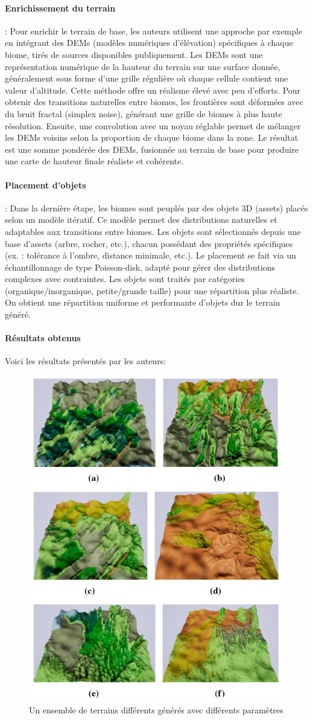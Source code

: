     \paragraph{Enrichissement du terrain}: Pour enrichir le terrain de base, les auteurs utilisent une approche par exemple en intégrant des DEMs (modèles numériques d'élévation) spécifiques à chaque biome, tirés de sources disponibles publiquement. Les DEMs sont une représentation numérique de la hauteur du terrain sur une surface donnée, généralement sous forme d'une grille régulière où chaque cellule contient une valeur d'altitude. Cette méthode offre un réalisme élevé avec peu d’efforts.
    Pour obtenir des transitions naturelles entre biomes, les frontières sont déformées avec du bruit fractal (simplex noise), générant une grille de biomes à plus haute résolution. Ensuite, une convolution avec un noyau réglable permet de mélanger les DEMs voisins selon la proportion de chaque biome dans la zone. Le résultat est une somme pondérée des DEMs, fusionnée au terrain de base pour produire une carte de hauteur finale réaliste et cohérente.

    \paragraph{Placement d'objets}: Dans la dernière étape, les biomes sont peuplés par des objets 3D (assets) placés selon un modèle itératif. Ce modèle permet des distributions naturelles et adaptables aux transitions entre biomes. Les objets sont sélectionnés depuis une base d’assets (arbre, rocher, etc.), chacun possédant des propriétés spécifiques (ex. : tolérance à l’ombre, distance minimale, etc.).
    Le placement se fait via un échantillonnage de type Poisson-disk, adapté pour gérer des distributions complexes avec contraintes. Les objets sont traités par catégories (organique/inorganique, petite/grande taille) pour une répartition plus réaliste. On obtient une répartition uniforme et performante d'objets dur le terrain généré.
    

    \paragraph{Résultats obtenus}
    Voici les résultats présentés par les auteurs:
    \begin{figure}[!h]
        \centering
        \includegraphics[width=0.4\linewidth]{images/Resultat_autobiomes.png}
        \caption{Un ensemble de terrains différents générés avec différents paramètres}
        \label{fig:enter-label}
    \end{figure}

